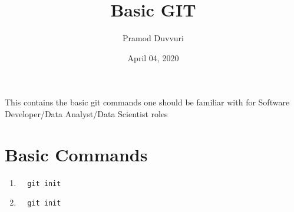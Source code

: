 \documentclass[11pt]{article}
\title{Basic GIT}
\author{Pramod Duvvuri}
\date{April 04, 2020}
\begin{document}
	\maketitle
	This contains the basic git commands one should be familiar with for Software Developer/Data Analyst/Data Scientist roles 
   \section*{Basic Commands}
   \begin{enumerate}
   	\item \begin{verbatim}  git init \end{verbatim}
    \item \begin{verbatim}  git init \end{verbatim}  	
   \end{enumerate}
\end{document}
